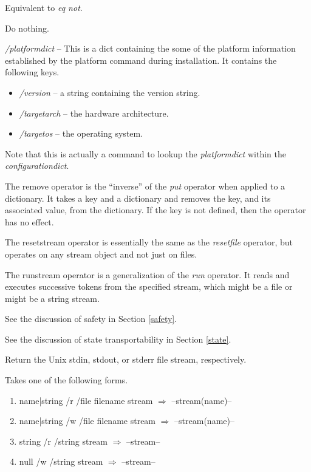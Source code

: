 \begin{description}
\item[neq]
Equivalent to {\em eq not}.
\item[noop]
Do nothing.
\item {\em /platformdict} -- 
This is a dict containing the some of the platform information
established by the platform command during installation.
It contains the following keys.
    \begin{itemize}
	\item {\em /version} -- a string containing the version string.
	\item {\em /targetarch} -- the hardware architecture.
	\item {\em /targetos} -- the operating system.
    \end{itemize}
Note that this is actually a command to lookup the {\em platformdict}
within the {\em configurationdict}.
\item[remove]
The remove operator is the ``inverse'' of the {\em put} operator
when applied to a dictionary.
It takes a key and a dictionary and removes the key, and its associated value,
from the dictionary.  If the key is not defined, then the operator
has no effect.
\item[resetstream]
The resetstream operator is essentially the same as the
{\em resetfile} operator, but operates on any stream
object and not just on files.
\item[runstream]
The runstream operator is a generalization of the {\em run} operator.
It reads and executes successive tokens from the specified stream,
which might be a file or might be a string stream.
\item[safecheck, safeexec, safestate]
See the discussion of safety in Section \ref{safety}.
\item[stateexec, statesave, staterestore]
See the discussion of state transportability in Section \ref{state}.
\item[stdin, stdout, stderr]
Return the Unix stdin, stdout, or stderr file stream, respectively.
\item[stream]
Takes one of the following forms.
\begin{enumerate}
\item name|string /r /file filename stream $\Rightarrow$ --stream(name)--
\item name|string /w /file filename stream $\Rightarrow$ --stream(name)--
\item string /r /string stream $\Rightarrow$ --stream--
\item null /w /string stream $\Rightarrow$ --stream--

\end{enumerate}
\end{description}
